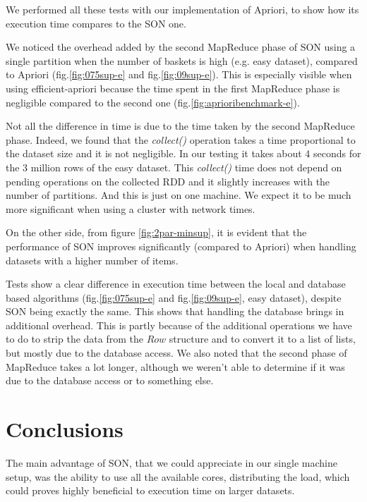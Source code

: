 \documentclass[a4paper]{article}
\begin{document}
	We performed all these tests with our implementation of Apriori, to show how its execution time compares to the SON one.
	
	We noticed the overhead added by the second MapReduce phase of SON using a single partition when the number of baskets is high (e.g. easy dataset), compared to Apriori (fig.\ref{fig:075sup-e} and fig.\ref{fig:09sup-e}). This is especially visible when using efficient-apriori because the time spent in the first MapReduce phase is negligible compared to the second one (fig.\ref{fig:aprioribenchmark-e}).

	Not all the difference in time is due to the time taken by the second MapReduce phase. Indeed, we found that the \textit{collect()} operation takes a time proportional to the dataset size and it is not
	negligible. In our testing it takes about 4 seconds for the 3 million rows of the easy dataset. This \textit{collect()} time does not depend on pending operations on the collected RDD and it slightly increases with the number of partitions. And this is just on one machine. We expect it to be much
	more significant when using a cluster with network times.

	On the other side, from figure \ref{fig:2par-minsup}, it is evident that the performance of SON improves significantly (compared to Apriori) when handling datasets with a higher number of items. %

	Tests show a clear difference in execution time between the local and database based algorithms (fig.\ref{fig:075sup-e} and fig.\ref{fig:09sup-e}, easy dataset), despite SON being exactly the same. This shows that handling the database brings in additional overhead.
	This is partly because of the additional operations we have to do to strip the data from the $Row$ structure and to convert it to a list of lists, but mostly due to the database access. We also noted that the second phase of MapReduce takes a lot longer, although we weren't able to determine if it was due to the database access or to something else.
	
	\section{Conclusions}
	\label{section:conclusion}
	The main advantage of SON, that we could appreciate in our single machine setup, was the ability to use all the available cores, distributing the load, which could proves highly beneficial to execution time on larger datasets.
\end{document}
